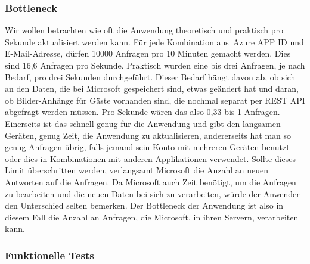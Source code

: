\subsubsection{Bottleneck}\label{subsubsec:test-bottleneck}
\newline
\newline
{}
Wir wollen betrachten wie oft die Anwendung theoretisch und praktisch pro Sekunde aktualisiert werden kann.
Für jede Kombination aus~\gls{Azure APP ID} und E-Mail-Adresse, dürfen 10000 Anfragen pro 10 Minuten gemacht werden.
Dies sind 16,6 Anfragen pro Sekunde.
Praktisch wurden eine bis drei Anfragen, je nach Bedarf, pro drei Sekunden durchgeführt.
Dieser Bedarf hängt davon ab, ob sich an den Daten, die bei Microsoft gespeichert sind, etwas geändert hat und daran, ob Bilder-Anhänge für Gäste vorhanden sind, die nochmal separat per REST API abgefragt werden müssen.
Pro Sekunde wären das also 0,33 bis 1 Anfragen.
Einerseits ist das schnell genug für die Anwendung und gibt den langsamen Geräten, genug Zeit, die Anwendung zu aktualisieren, andererseits hat man so genug Anfragen übrig, falls jemand sein Konto mit mehreren Geräten benutzt oder dies in Kombinationen mit anderen Applikationen verwendet.
Sollte dieses Limit überschritten werden, verlangsamt Microsoft die Anzahl an neuen Antworten auf die Anfragen.
Da Microsoft auch Zeit benötigt, um die Anfragen zu bearbeiten und die neuen Daten bei sich zu verarbeiten, würde der Anwender den Unterschied selten bemerken.
Der \gls{Bottleneck} der Anwendung ist also in diesem Fall die Anzahl an Anfragen, die Microsoft, in ihren Servern, verarbeiten kann.
\newline
\newline
\subsubsection{Funktionelle Tests}\label{subsubsec:funktionelle-tests}

